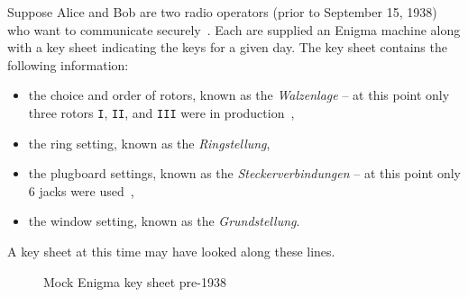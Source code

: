 Suppose Alice and Bob are two radio operators (prior to September 15,
1938) who want to communicate securely~\cite[p.~546]{Rejewski1981}. Each are supplied an Enigma
machine along with a key sheet indicating the keys for a given day.
The key sheet contains the following information:
\begin{itemize}
  \item the choice and order of rotors, known as the
    \emph{Walzenlage} -- at this point only three
    rotors \texttt{I}, \texttt{II}, and \texttt{III} were in
    production~\cite[p.~214]{Rejewski1980},
  \item the ring setting, known as the \emph{Ringstellung},
  \item the plugboard settings, known as the
    \emph{Steckerverbindungen} -- at this point only 6 jacks were used~\cite[p.~242]{KozaczukEnigma1984},

  \item the window setting, known as the \emph{Grundstellung}.
\end{itemize}
A key sheet at this time may have looked along these lines.

\begin{figure}[H]
  \begin{center}
  \end{center}
  \caption{Mock Enigma key sheet pre-1938}
  \label{fig:keysheet_early}
\end{figure}

